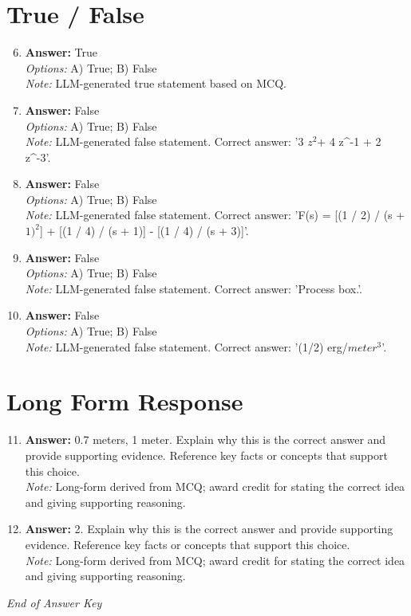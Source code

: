 \documentclass[12pt]{article}
\begin{document}
\section*{True / False}
\begin{enumerate}[label=\arabic*.]
\setcounter{enumi}{5}
\item \textbf{Answer:} True
\\ \textit{Options:} A) True; B) False
\\ \textit{Note:} LLM-generated true statement based on MCQ.
\item \textbf{Answer:} False
\\ \textit{Options:} A) True; B) False
\\ \textit{Note:} LLM-generated false statement. Correct answer: '3 $z^2$+ 4 z^-1 + 2 z^-3'.
\item \textbf{Answer:} False
\\ \textit{Options:} A) True; B) False
\\ \textit{Note:} LLM-generated false statement. Correct answer: 'F(s) = [(1 / 2) / (s + $1)^2$] + [(1 / 4) / (s + 1)] - [(1 / 4) / (s + 3)]'.
\item \textbf{Answer:} False
\\ \textit{Options:} A) True; B) False
\\ \textit{Note:} LLM-generated false statement. Correct answer: 'Process box.'.
\item \textbf{Answer:} False
\\ \textit{Options:} A) True; B) False
\\ \textit{Note:} LLM-generated false statement. Correct answer: '(1/2) erg/$meter^3$'.
\end{enumerate}

\section*{Long Form Response}
\begin{enumerate}[label=\arabic*.]
\setcounter{enumi}{10}
\item \textbf{Answer:} 0.7 meters, 1 meter. Explain why this is the correct answer and provide supporting evidence. Reference key facts or concepts that support this choice.
\\ \textit{Note:} Long-form derived from MCQ; award credit for stating the correct idea and giving supporting reasoning.
\item \textbf{Answer:} 2. Explain why this is the correct answer and provide supporting evidence. Reference key facts or concepts that support this choice.
\\ \textit{Note:} Long-form derived from MCQ; award credit for stating the correct idea and giving supporting reasoning.
\end{enumerate}

\vfill
\noindent\textit{End of Answer Key}
\end{document}
